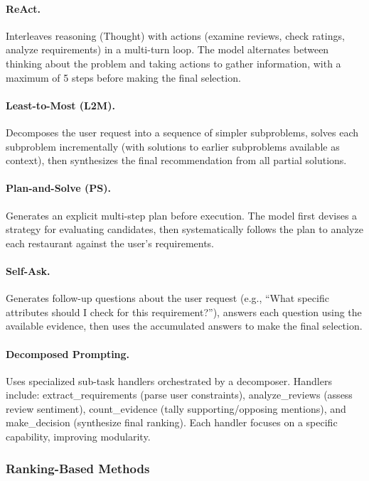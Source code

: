 \paragraph{ReAct.}
Interleaves reasoning (Thought) with actions (examine reviews, check ratings, analyze requirements) in a multi-turn loop.
The model alternates between thinking about the problem and taking actions to gather information, with a maximum of 5 steps before making the final selection.

\paragraph{Least-to-Most (L2M).}
Decomposes the user request into a sequence of simpler subproblems, solves each subproblem incrementally (with solutions to earlier subproblems available as context), then synthesizes the final recommendation from all partial solutions.

\paragraph{Plan-and-Solve (PS).}
Generates an explicit multi-step plan before execution.
The model first devises a strategy for evaluating candidates, then systematically follows the plan to analyze each restaurant against the user's requirements.

\paragraph{Self-Ask.}
Generates follow-up questions about the user request (e.g., ``What specific attributes should I check for this requirement?''), answers each question using the available evidence, then uses the accumulated answers to make the final selection.

\paragraph{Decomposed Prompting.}
Uses specialized sub-task handlers orchestrated by a decomposer.
Handlers include: extract\_requirements (parse user constraints), analyze\_reviews (assess review sentiment), count\_evidence (tally supporting/opposing mentions), and make\_decision (synthesize final ranking).
Each handler focuses on a specific capability, improving modularity.

\subsubsection{Ranking-Based Methods}

